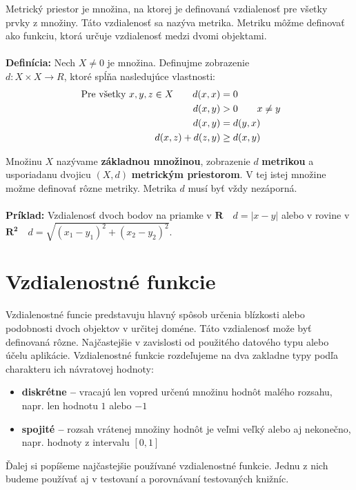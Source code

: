 \documentclass[12pt,oneside]{fithesis2}
\begin{document}
    Metrický priestor je množina, na ktorej je definovaná vzdialenosť pre všetky prvky z množiny. Táto vzdialenosť sa nazýva metrika. Metriku môžme definovať ako funkciu, ktorá určuje vzdialenosť medzi dvomi objektami. \\ \\
    \textbf{Definícia:} Nech $X\neq 0$ je množina. Definujme zobrazenie \\ $d: X \times X \rightarrow R $, ktoré spĺňa nasledujúce vlastnosti:
    \begin{align*}
    \textrm{ Pre všetky } x,y,z \in X \qquad d(x,x) &= 0 \\
    d(x,y) &\textgreater 0 \qquad x\neq y \\
    d(x,y) &= d(y,x) \\
    d(x,z) + d(z,y) &\geq d(x,y)
    \end{align*}
    
    Množinu \textbf{$X$} nazývame \textbf{základnou množinou}, zobrazenie $d$ \textbf{metrikou} a usporiadanu dvojicu $(X,d)$ \textbf{metrickým priestorom}.
    V tej istej množine možme definovať rôzne metriky. Metrika $d$ musí byť vždy nezáporná. \\ \\
    \textbf{Príklad:} 
    Vzdialenosť dvoch bodov na priamke v $ \mathbf{R} \quad d=|x-y| $ alebo v rovine v
     $\mathbf{R^2} \quad d = \sqrt{(x_1-y_1)^2+(x_2-y_2)^2}$.
    
	\section{Vzdialenostné funkcie}
	Vzdialenostné funcie predstavuju hlavný spôsob určenia blízkosti alebo podobnosti dvoch objektov v určitej doméne. Táto vzdialenosť može byť definovaná rôzne. Najčastejšie v zavislosti od použitého datového typu alebo účelu aplikácie.
	Vzdialenostné funkcie rozdeľujeme na dva zakladne typy podľa charakteru ich návratovej hodnoty:
	\begin{itemize}
	\item \textbf{diskrétne --} vracajú len vopred určenú množinu hodnôt malého rozsahu, napr. 	     len hodnotu $1$ alebo $-1$
	\item \textbf{spojité --} rozsah vrátenej množiny hodnôt je veľmi veľký alebo aj nekonečno, 		napr. hodnoty z intervalu $[0,1]$
	\end{itemize}
	Ďalej si popíšeme najčastejšie používané vzdialenostné funkcie. Jednu z nich budeme používať aj v testovaní a porovnávaní testovaných knižníc.
\end{document}
